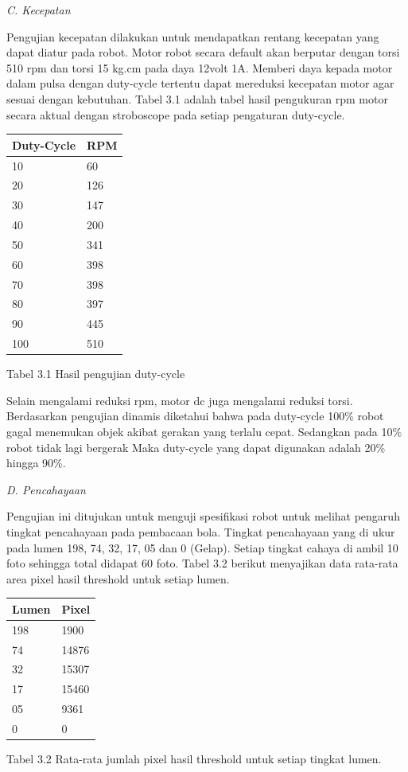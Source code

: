\documentclass[10pt,journal,compsoc]{IEEEtran}
\begin{document}
  \noindent \textit{C. Kecepatan}
  
  Pengujian kecepatan dilakukan untuk mendapatkan rentang kecepatan yang dapat diatur pada robot. 
  Motor robot secara default akan berputar dengan torsi 510 rpm dan torsi 15 kg.cm pada daya 12volt 1A. 
  Memberi daya kepada motor dalam pulsa dengan duty-cycle tertentu dapat mereduksi kecepatan motor agar sesuai dengan kebutuhan. 
  Tabel 3.1 adalah tabel hasil pengukuran rpm motor secara aktual dengan stroboscope pada setiap pengaturan duty-cycle.
  
  \begin{center}
   \begin{tabular}{ |l|l| }
    \hline
    Duty-Cycle & RPM\\
   \hline
    10 & 60\\
    20 & 126\\
    30 & 147\\
    40 & 200\\
    50 & 341\\
    60 & 398\\
    70 & 398\\
    80 & 397\\
    90 & 445\\
    100 & 510\\
    \hline
   \end{tabular}
   
  Tabel 3.1 Hasil pengujian duty-cycle
  \end{center}
  
  Selain mengalami reduksi rpm, motor dc juga mengalami reduksi torsi. 
  Berdasarkan pengujian dinamis diketahui bahwa pada duty-cycle 100\% robot gagal menemukan objek akibat gerakan yang terlalu cepat.
  Sedangkan pada 10\% robot tidak lagi bergerak
  Maka duty-cycle yang dapat digunakan adalah 20\% hingga 90\%.
  
  \noindent \textit{D. Pencahayaan}
  
  Pengujian ini ditujukan untuk menguji spesifikasi robot untuk melihat pengaruh tingkat pencahayaan pada pembacaan bola.
  Tingkat pencahayaan yang di ukur pada lumen 198, 74, 32, 17, 05 dan 0 (Gelap). 
  Setiap tingkat cahaya di ambil 10 foto sehingga total didapat 60 foto.
  Tabel 3.2 berikut menyajikan data rata-rata area pixel hasil threshold untuk setiap lumen.
  
    \begin{center}
   \begin{tabular}{ |l|l| }
    \hline
    Lumen & Pixel\\
   \hline
    198 & 1900\\
    74 & 14876\\
    32 & 15307\\
    17 & 15460\\
    05 & 9361\\
    0 & 0\\
    \hline
   \end{tabular}
  
  Tabel 3.2 Rata-rata jumlah pixel hasil threshold untuk setiap tingkat lumen.
 
  \end{center}
  
\end{document}
